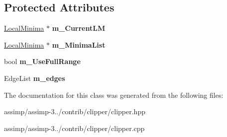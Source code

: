 \subsection*{Protected Attributes}
\begin{DoxyCompactItemize}
\item 
\hypertarget{class_clipper_lib_1_1_clipper_base_a4e3039382d3c8ec6f9ab434021be8d43}{\hyperlink{struct_clipper_lib_1_1_local_minima}{Local\+Minima} $\ast$ {\bfseries m\+\_\+\+Current\+L\+M}}\label{class_clipper_lib_1_1_clipper_base_a4e3039382d3c8ec6f9ab434021be8d43}

\item 
\hypertarget{class_clipper_lib_1_1_clipper_base_a74df45b228436fa0243b53cc00192a5f}{\hyperlink{struct_clipper_lib_1_1_local_minima}{Local\+Minima} $\ast$ {\bfseries m\+\_\+\+Minima\+List}}\label{class_clipper_lib_1_1_clipper_base_a74df45b228436fa0243b53cc00192a5f}

\item 
\hypertarget{class_clipper_lib_1_1_clipper_base_aea11d183617adc12d7ba2b84533f7f45}{bool {\bfseries m\+\_\+\+Use\+Full\+Range}}\label{class_clipper_lib_1_1_clipper_base_aea11d183617adc12d7ba2b84533f7f45}

\item 
\hypertarget{class_clipper_lib_1_1_clipper_base_a8bfc007c0c0afd4e9d252dac0ef5daa0}{Edge\+List {\bfseries m\+\_\+edges}}\label{class_clipper_lib_1_1_clipper_base_a8bfc007c0c0afd4e9d252dac0ef5daa0}

\end{DoxyCompactItemize}


The documentation for this class was generated from the following files\+:\begin{DoxyCompactItemize}
\item 
assimp/assimp-\/3../contrib/clipper/clipper.\+hpp\item 
assimp/assimp-\/3../contrib/clipper/clipper.\+cpp\end{DoxyCompactItemize}
